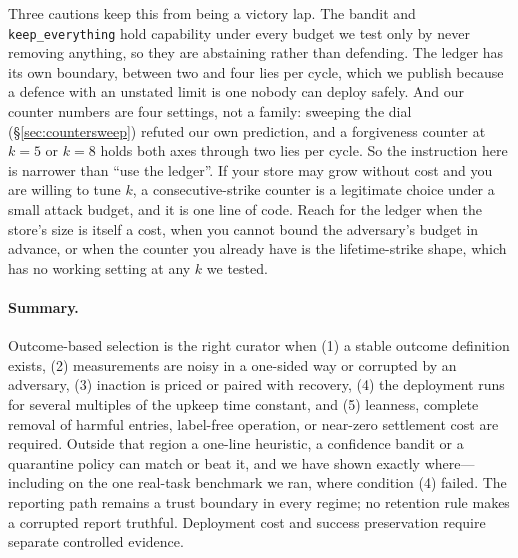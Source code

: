 Three cautions keep this from being a victory lap. The bandit and
\texttt{keep\_everything} hold capability under every budget we test only
by never removing anything, so they are abstaining rather than defending.
The ledger has its own boundary, between two and four lies per cycle,
which we publish because a defence with an unstated limit is one nobody
can deploy safely. And our counter numbers are four settings, not a
family: sweeping the dial (\S\ref{sec:countersweep}) refuted our own
prediction, and a forgiveness counter at $k{=}5$ or $k{=}8$ holds both
axes through two lies per cycle. So the instruction here is narrower than
``use the ledger''. If your store may grow without cost and you are
willing to tune $k$, a consecutive-strike counter is a legitimate choice
under a small attack budget, and it is one line of code. Reach for the
ledger when the store's size is itself a cost, when you cannot bound the
adversary's budget in advance, or when the counter you already have is
the lifetime-strike shape, which has no working setting at any $k$ we
tested.


\paragraph{Summary.}
Outcome-based selection is the right curator when (1) a stable
outcome definition exists, (2) measurements are noisy in a one-sided way or
corrupted by an adversary, (3) inaction is priced or paired with
recovery, (4) the deployment runs for several multiples of the upkeep
time constant, and (5) leanness, complete removal of harmful entries,
label-free operation, or near-zero settlement cost are required. Outside
that region a one-line heuristic, a confidence bandit or a quarantine
policy can match or beat it, and we have shown exactly where---including
on the one real-task benchmark we ran, where condition (4) failed. The reporting path remains a trust boundary in every regime; no
retention rule makes a corrupted report truthful. Deployment cost and
success preservation require separate controlled evidence.
